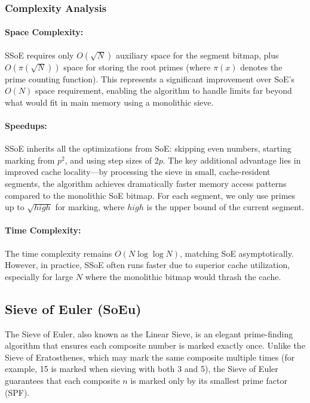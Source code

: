 \documentclass{article}
\begin{document}
\subsubsection*{Complexity Analysis}

\paragraph{Space Complexity:} SSoE requires only $O(\sqrt{N})$ auxiliary space for the segment bitmap, plus $O(\pi(\sqrt{N}))$ space for storing the root primes (where $\pi(x)$ denotes the prime counting function). This represents a significant improvement over SoE's $O(N)$ space requirement, enabling the algorithm to handle limits far beyond what would fit in main memory using a monolithic sieve.

\paragraph{Speedups:}
SSoE inherits all the optimizations from SoE: skipping even numbers, starting marking from $p^2$, and using step sizes of $2p$. The key additional advantage lies in improved cache locality—by processing the sieve in small, cache-resident segments, the algorithm achieves dramatically faster memory access patterns compared to the monolithic SoE bitmap. For each segment, we only use primes up to $\sqrt{high}$ for marking, where $high$ is the upper bound of the current segment.

\paragraph{Time Complexity:} The time complexity remains $O(N \log \log N)$, matching SoE asymptotically. However, in practice, SSoE often runs faster due to superior cache utilization, especially for large $N$ where the monolithic bitmap would thrash the cache.

\subsection{Sieve of Euler (SoEu)} \label{alg:soeu}

The Sieve of Euler, also known as the Linear Sieve, is an elegant prime-finding algorithm that ensures each composite number is marked exactly once. Unlike the Sieve of Eratosthenes, which may mark the same composite multiple times (for example, 15 is marked when sieving with both 3 and 5), the Sieve of Euler guarantees that each composite $n$ is marked only by its smallest prime factor (SPF).
\end{document}
